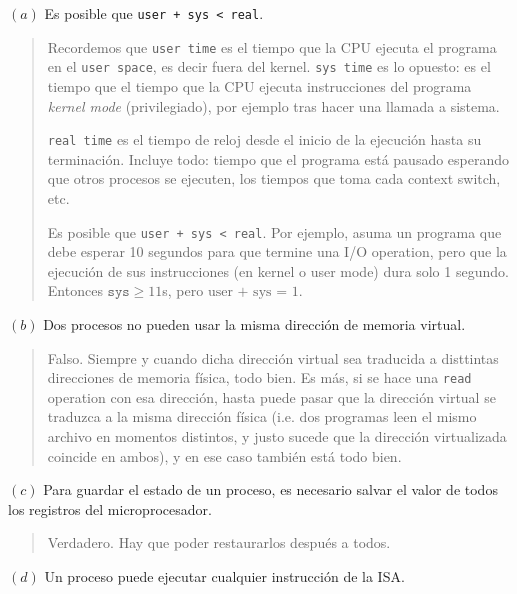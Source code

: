 \documentclass[12pt]{article}
\theoremstyle{definition}
\begin{document}
$(a)$ Es posible que \texttt{user + sys < real}.


\small
\begin{quote}

Recordemos que \texttt{user time} es el tiempo que la CPU ejecuta el programa en
el \texttt{user space}, es decir fuera del kernel. \texttt{sys time} es lo
opuesto: es el tiempo que el tiempo que la CPU ejecuta instrucciones del
programa \textit{kernel mode} (privilegiado), por ejemplo tras hacer una llamada
a sistema. 

\texttt{real time} es el tiempo de reloj desde el inicio de la ejecución hasta
su terminación. Incluye todo: tiempo que el programa está pausado esperando que
otros procesos se ejecuten, los tiempos que toma cada context switch, etc.

Es posible que \texttt{user + sys < real}. Por ejemplo, asuma un programa que
debe esperar 10 segundos para que termine una I/O operation, pero que la
ejecución de sus instrucciones (en kernel o user mode) dura solo 1 segundo.
Entonces $\texttt{sys} \geq 11$s, pero $\text{user + sys = 1}$.

\end{quote}
\normalsize

$(b)$ Dos procesos no pueden usar la misma dirección de memoria virtual. 


\small
\begin{quote}

Falso. Siempre y cuando dicha dirección virtual sea traducida a disttintas
direcciones de memoria física, todo bien. Es más, si se hace una \texttt{read}
operation con esa dirección, hasta puede pasar que la dirección virtual se
traduzca a la misma dirección física (i.e. dos programas leen el mismo archivo
en momentos distintos, y justo sucede que la dirección virtualizada coincide en
ambos), y en ese caso también está todo bien.

\end{quote}
\normalsize

$(c)$ 
Para guardar el estado de un proceso, es necesario salvar el valor de
todos los registros del microprocesador.


\small
\begin{quote}

Verdadero. Hay que poder restaurarlos después a todos.

\end{quote}
\normalsize

$(d)$ Un proceso puede ejecutar cualquier instrucción de la ISA.
\end{document}
